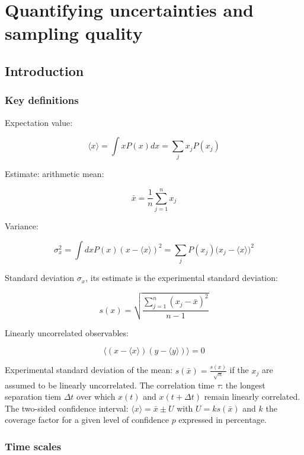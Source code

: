 \graphicspath{{chapters/14/images}}
\chapter{Quantifying uncertainties and sampling quality}

\section{Introduction}

	\subsection{Key definitions}
	Expectation value:

	$$\langle x\rangle = \int xP(x)dx = \sum\limits_jx_jP(x_j)$$

	Estimate: arithmetic mean:

	$$\bar{x} = \frac{1}{n}\sum\limits_{j=1}^nx_j$$

	Variance:

	$$\sigma^2_x = \int dxP(x)(x-\langle x\rangle)^2 = \sum\limits_{j}P(x_j)\bigl(x_j-\langle x\rangle\bigr)^2$$

	Standard deviation $\sigma_x$, its estimate is the experimental standard deviation:

	$$s(x) = \sqrt{\frac{\sum\limits_{j=1}^n(x_j-\bar{x})^2}{n-1}}$$

	Linearly uncorrelated observables:

	$$\bigl\langle(x-\langle x\rangle)(y-\langle y\rangle)\bigr\rangle = 0$$

	Experimental standard deviation of the mean: $s(\bar{x}) = \frac{s(x)}{\sqrt{n}}$ if the $x_j$ are assumed to be linearly uncorrelated.
	The correlation time $\tau$: the longest separation tiem $\Delta t$ over which $x(t)$ and $x(t + \Delta t)$ remain linearly correlated.
	The two-sided confidence interval: $\langle x\rangle = \bar{x} \pm U$ with $U = ks(\bar{x})$ and $k$ the coverage factor for a given level of confidence $p$ expressed in percentage.

	\subsection{Time scales}

